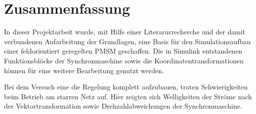 
\chapter{Zusammenfassung}
\label{cha:zusammenfassung}

In dieser Projektarbeit wurde, mit Hilfe einer Literarurrecherche und der damit verbundenen Aufarbeitung der Grundlagen, eine Basis für den Simulationsaufbau einer feldorientiert geregelten PMSM geschaffen.
Die in Simulink entstandenen Funktionsblöcke der Synchronmaschine sowie die Koordinatentransformationen können für eine weitere Bearbeitung genutzt werden.

Bei dem Versuch eine die Regelung komplett aufzubauen, traten Schwierigkeiten beim Betrieb am starren Netz auf. 
Hier zeigten sich Welligkeiten der Ströme nach der Vektortransformation sowie Drehzahlabweichungen der Synchronmaschine.




